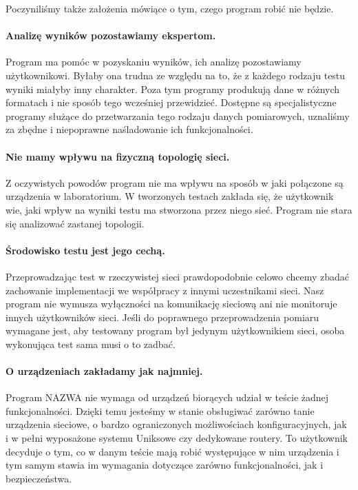 \documentclass[00-praca-magisterska.tex]{subfiles}
\begin{document}
Poczyniliśmy także założenia mówiące o tym, czego program robić nie będzie.

\paragraph{Analizę wyników pozostawiamy ekspertom.} Program ma pomóc w
pozyskaniu wyników, ich analizę pozostawiamy użytkownikowi. Byłaby ona trudna ze
względu na to, że z każdego rodzaju testu wyniki miałyby inny charakter. Poza
tym programy produkują dane w różnych formatach i nie sposób tego wcześniej
przewidzieć. Dostępne są specjalistyczne programy służące do przetwarzania tego
rodzaju danych pomiarowych, uznaliśmy za zbędne i niepoprawne naśladowanie ich
funkcjonalności.

\paragraph{Nie mamy wpływu na fizyczną topologię sieci.} Z oczywistych powodów
program nie ma wpływu na sposób w jaki połączone są urządzenia w laboratorium. W
tworzonych testach zakłada się, że użytkownik wie, jaki wpływ na wyniki testu ma
stworzona przez niego sieć. Program nie stara się analizować zastanej topologii.

\paragraph{Środowisko testu jest jego cechą.} Przeprowadzając test w
rzeczywistej sieci prawdopodobnie celowo chcemy zbadać zachowanie implementacji
we współpracy z innymi uczestnikami sieci. Nasz program nie wymusza wyłączności
na komunikację sieciową ani nie monitoruje innych użytkowników sieci. Jeśli do
poprawnego przeprowadzenia pomiaru wymagane jest, aby testowany program był
jedynym użytkownikiem sieci, osoba wykonująca test sama musi o to zadbać.

\paragraph{O urządzeniach zakładamy jak najmniej.} Program NAZWA nie
wymaga od urządzeń biorących udział w teście żadnej funkcjonalności.
Dzięki temu jesteśmy w stanie obsługiwać zarówno tanie urządzenia sieciowe, o
bardzo ograniczonych możliwościach konfiguracyjnych, jak i w pełni wyposażone
systemu Uniksowe czy dedykowane routery. To użytkownik decyduje o tym, co w
danym teście mają robić występujące w nim urządzenia i tym samym stawia
im wymagania dotyczące zarówno funkcjonalności, jak i bezpieczeństwa.
\end{document}
